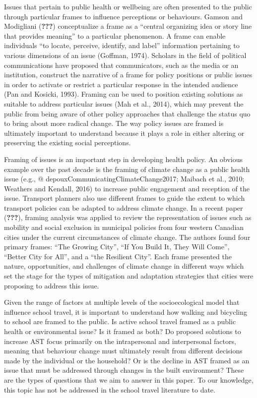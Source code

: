 \documentclass[]{elsarticle} %
\begin{document}
Issues that pertain to public health or wellbeing are often presented to
the public through particular frames to influence perceptions or
behaviours. Gamson and Modigliani ({\textbf{???}}) conceptualize a frame
as a ``central organizing idea or story line that provides meaning'' to
a particular phenomenon. A frame can enable individuals ``to locate,
perceive, identify, and label'' information pertaining to various
dimensions of an issue (Goffman, 1974). Scholars in the field of
political communications have proposed that communicators, such as the
media or an institution, construct the narrative of a frame for policy
positions or public issues in order to activate or restrict a particular
response in the intended audience (Pan and Kosicki, 1993). Framing can
be used to position existing solutions as suitable to address particular
issues (Mah et al., 2014), which may prevent the public from being aware
of other policy approaches that challenge the status quo to bring about
more radical change. The way policy issues are framed is ultimately
important to understand because it plays a role in either altering or
preserving the existing social perceptions.

Framing of issues is an important step in developing health policy. An
obvious example over the past decade is the framing of climate change as
a public health issue (e.g., @ depouxCommunicatingClimateChange2017;
Maibach et al., 2010; Weathers and Kendall, 2016) to increase public
engagement and reception of the issue. Transport planners also use
different frames to guide the extent to which transport policies can be
adapted to address climate change. In a recent paper ({\textbf{???}}),
framing analysis was applied to review the representation of issues such
as mobility and social exclusion in municipal policies from four western
Canadian cities under the current circumstances of climate change. The
authors found four primary frames: ``The Growing City'', ``If You Build
It, They Will Come'', ``Better City for All'', and a ``the Resilient
City''. Each frame presented the nature, opportunities, and challenges
of climate change in different ways which set the stage for the types of
mitigation and adaptation strategies that cities were proposing to
address this issue.

Given the range of factors at multiple levels of the socioecological
model that influence school travel, it is important to understand how
walking and bicycling to school are framed to the public. Is active
school travel framed as a public health or environmental issue? Is it
framed as both? Do proposed solutions to increase AST focus primarily on
the intrapersonal and interpersonal factors, meaning that behaviour
change must ultimately result from different decisions made by the
individual or the household? Or is the decline in AST framed as an issue
that must be addressed through changes in the built environment? These
are the types of questions that we aim to answer in this paper. To our
knowledge, this topic has not be addressed in the school travel
literature to date.
\end{document}
